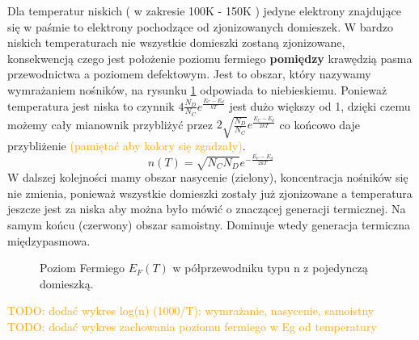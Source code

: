             \noindent Dla temperatur niskich ( w zakresie 100K - 150K ) jedyne elektrony znajdujące się w paśmie to elektrony pochodzące od zjonizowanych domieszek. W bardzo niskich temperaturach nie wszystkie domieszki zostaną zjonizowane, 
            konsekwencją czego jest położenie poziomu fermiego \textbf{pomiędzy} krawędzią pasma przewodnictwa a poziomem defektowym. Jest to obszar, który nazywamy wymrażaniem nośników, na rysunku \ref{fig: Ef-vs-T-n-single-doping} odpowiada 
            to niebieskiemu. Ponieważ temperatura jest niska to czynnik $4 \frac{N_D}{N_C}e^{\frac{E_C - E_d}{kT}}$ jest dużo większy od 1, dzięki czemu możemy cały mianownik przybliżyć przez $2\sqrt{\frac{N_D}{N_C}}e^{\frac{E_C - E_d}{2kT}}$
            co końcowo daje przybliżenie \textcolor{orange}{(pamiętać aby kolory się zgadzały)}.
            \begin{equation}
                n(T) = \sqrt{N_CN_D}e^{-\frac{E_C - E_d}{2kT}} \nonumber
            \end{equation}
            W dalszej kolejności mamy obszar nasycenie (zielony), koncentracja nośników się nie zmienia, ponieważ wszystkie domieszki zostały już zjonizowane a temperatura jeszcze jest za niska aby można było mówić o 
            znaczącej generacji termicznej. Na samym końcu (czerwony) obszar samoistny. Dominuje wtedy generacja termiczna międzypasmowa.
            \begin{figure}[H]
                \centering
                \begin{minipage}[t]{0.48\textwidth}
                    \centering
                    \caption{Zależność $\log(n)$ od $1000/T$ dla półprzewodnika z pojedynczą domieszką donorową}
                    \label{fig: logn-vs-invT-}
                \end{minipage}
                \hfill
                \begin{minipage}[t]{0.48\textwidth}
                    \centering
                    \caption{Poziom Fermiego $E_F(T)$ w półprzewodniku typu n z pojedynczą domieszką.}
                    \label{fig: Ef-vs-T-n-single-doping}
                \end{minipage}
            \end{figure}
            \noindent \textcolor{orange}{TODO: dodać wykres log(n) (1000/T): wymrażanie, nasycenie, samoistny }\newline
            \noindent \textcolor{orange}{TODO: dodać wykres zachowania poziomu fermiego w Eg od temperatury}\newline
            
